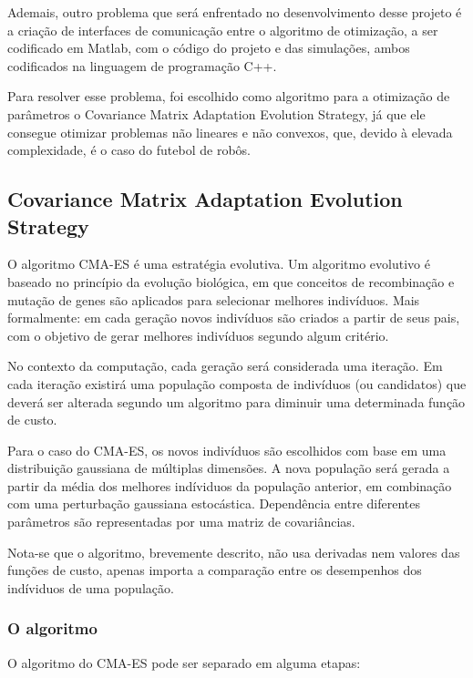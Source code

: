 \documentclass[a4paper,12pt]{article}
\begin{document}
Ademais, outro problema que será enfrentado no desenvolvimento desse projeto é a criação de interfaces de comunicação entre o algoritmo de otimização, a ser codificado em Matlab, com o código do projeto e das simulações, ambos codificados na linguagem de programação C++.

Para resolver esse problema, foi escolhido como algoritmo para a otimização de parâmetros o Covariance Matrix Adaptation Evolution Strategy, já que ele consegue otimizar problemas não lineares e não convexos, que, devido à elevada complexidade, é o caso do futebol de robôs.

\subsection{Covariance Matrix Adaptation Evolution Strategy}

O algoritmo CMA-ES é uma estratégia evolutiva. Um algoritmo evolutivo é baseado no princípio da evolução biológica, em que conceitos de recombinação e mutação de genes são aplicados para selecionar melhores indivíduos. Mais formalmente: em cada geração novos indivíduos são criados a partir de seus pais, com o objetivo de gerar melhores indivíduos segundo algum critério.

No contexto da computação, cada geração será considerada uma iteração. Em cada iteração existirá uma população composta de indivíduos (ou candidatos) que deverá ser alterada segundo um algoritmo para diminuir uma determinada função de custo. 

Para o caso do CMA-ES, os novos indivíduos são escolhidos com base em uma distribuição gaussiana de múltiplas dimensões. A nova população será gerada a partir da média dos melhores indíviduos da população anterior, em combinação com uma perturbação gaussiana estocástica. Dependência entre diferentes parâmetros são representadas por uma matriz de covariâncias.

Nota-se que o algoritmo, brevemente descrito, não usa derivadas nem valores das funções de custo, apenas importa a comparação entre os desempenhos dos indíviduos de uma população.

\subsubsection{O algoritmo}

O algoritmo do CMA-ES pode ser separado em alguma etapas:
\end{document}
